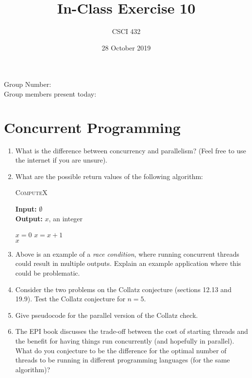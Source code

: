 \documentclass{article}
\title{In-Class Exercise 10}
\author{CSCI 432}
\date{28 October 2019}
\begin{document}
\maketitle

\noindent
Group Number:\\
Group members present today:

\section*{Concurrent Programming}

\begin{enumerate}
    \item What is the difference between concurrency and parallelism? (Feel
        free to use the internet if you are unsure).
        \vspace{1in}


    \item What are the possible return values of the following algorithm:
        \begin{algorithm}\caption{\textsc{ComputeX}}
                {\bf Input:} $\emptyset$\\
                {\bf Output:} $x$, an integer
            \begin{algorithmic}[1]
                \State $x=0$
                \State $x=x+1$
                \EndFor\\
                \Return $x$
            \end{algorithmic}
        \end{algorithm}

    \item Above is an  example of a \emph{race condition},
        where running concurrent
        threads could result in multiple outputs.  Explain an example
        application where this could be problematic.
        \vspace{3in}

    \pagebreak
    \item Consider the two problems on the Collatz conjecture (sections 12.13
        and 19.9).  Test the Collatz conjecture for $n=5$.
        \vspace{1in}

    \item Give pseudocode for the parallel version of the Collatz check.
        \vspace{3in}

    \item The EPI book discusses the trade-off between the cost of starting
        threads and the benefit for having things run concurrently (and
        hopefully in parallel).  What do you conjecture to be the difference for
        the optimal number of threads to be running in different programming
        languages (for the same algorithm)?
\end{enumerate}
\end{document}
